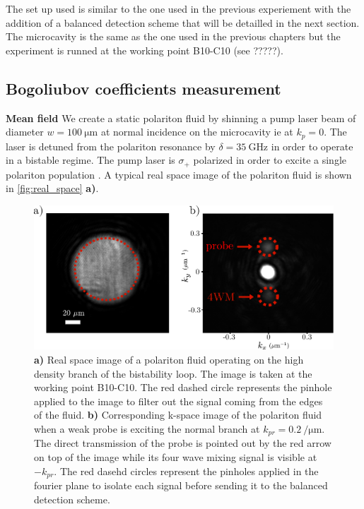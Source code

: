 The set up used is similar to the one used in the previous experiement with the addition of a balanced detection scheme that will be detailled in the next section. 
The microcavity is the same as the one used in the previous chapters but the experiment is runned at the working point B10-C10 (see ?????).

\bigskip

\subsection{Bogoliubov coefficients measurement}


\textbf{Mean field} We create a static polariton fluid by shinning a pump laser beam of diameter $w=\SI{100}{\micro\meter}$ at normal incidence on the microcavity ie at $k_p=0$. The laser is detuned from the polariton resonance by
$\delta = \SI{35}{\giga\hertz}$ in order to operate in a bistable regime. The pump laser is $\sigma_+$ polarized in order to excite a single polariton population \cite{timofeev_exciton_2012}. A typical real space image of the polariton fluid is shown in \autoref{fig:real_space} \textbf{a)}. 


\begin{figure}
    \centering
    \includegraphics[width=1\textwidth]{chap_correlation/fig/r_and_k_space.pdf}
    \caption{\textbf{a)} Real space image of a polariton fluid operating on the high density branch of the bistability loop. The image is taken at the working point B10-C10. The red dashed circle represents
    the pinhole applied to the image to filter out the signal coming from the edges of the fluid. \textbf{b)} Corresponding k-space image of the polariton fluid when a weak probe is exciting the normal branch at $k_{pr}=\SI{0.2}{\per\micro\meter}$. 
    The direct transmission of the probe is pointed out by the red arrow on top of the image while its four wave mixing signal is visible at $-k_{pr}$. The red dasehd circles represent the pinholes applied 
    in the fourier plane to isolate each signal before sending it to the balanced detection scheme. }
    \label{fig:real_space}
\end{figure}


